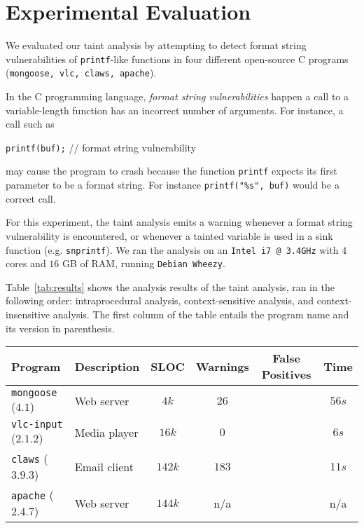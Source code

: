 \section{Experimental Evaluation}\label{sec:evaluation}
We evaluated our taint analysis by attempting to detect
format string vulnerabilities of \texttt{printf}-like functions
in four different open-source C programs ({\tt mongoose, vlc,
claws, apache}). 

In the C programming language, \textit{format string vulnerabilities}
happen a call to a variable-length function has an incorrect number
of arguments. For instance, a call such as
\begin{center}
{\tt printf(buf);} // format string vulnerability
\end{center}
may cause the program to crash because the function \texttt{printf}
expects its first parameter to be a format string. For
instance {\tt printf("\%s", buf)} would be a correct call.

For this experiment, the taint analysis emits a warning
whenever a format string vulnerability is encountered,
or whenever a tainted variable is used in a sink function
(e.g. \texttt{snprintf}).
We ran the analysis on an \texttt{Intel i7 @ 3.4GHz} with
$4$ cores and $16$ GB of RAM, running {\tt Debian Wheezy}.

Table~\ref{tab:results} shows the analysis results of the
taint analysis, ran in the following order: intraprocedural
analysis, context-sensitive analysis, and context-insensitive
analysis.
The first column of the table entails the program name and
its version in parenthesis.
\begin{table*}[!hbtp]
\centering
\begin{tabular}{|l|l|c|c|c|c|}
\hline
{\bf Program}				&	{\bf Description}	&	{\bf SLOC}	& {\bf Warnings}& {\bf False Positives} &	{\bf Time}	\\ \hline \hline
{\tt mongoose}	($4.1$)		&	Web server			&	$4k$		&	$26$		&						&	$56s$ 		\\ %
{\tt vlc-input}	($2.1.2$)	&	Media player		&	$16k$		&	$0$			&						&	$6s$ 		\\ %
{\tt claws}		($3.9.3$)	&	Email client		& 	$142k$ 		&	$183$		&						&	$11s$		\\ %
{\tt apache}	($2.4.7$)	&	Web server			&	$144k$		&	n/a			&						&	n/a	 		\\ \hline
\end{tabular}\caption{Taint Analysis Evaluation Results}\label{tab:results}
\end{table*}

